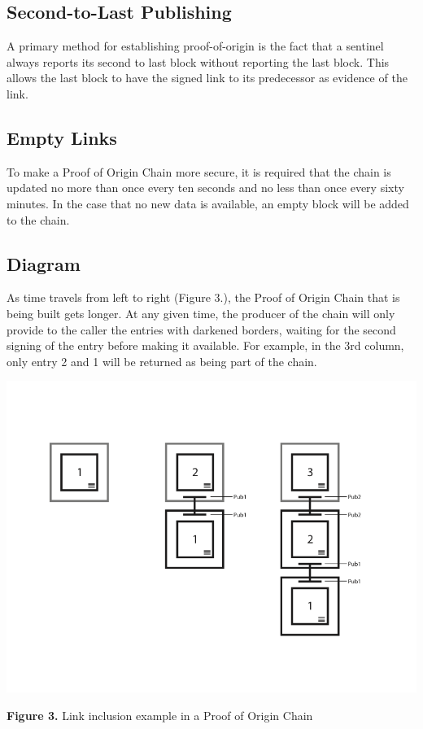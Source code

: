 \documentclass{article}
\begin{document}
\subsection {Second-to-Last Publishing}
A primary method for establishing \Gls{proof-of-origin} is the fact that a \Gls{sentinel} always reports its second to last block without reporting the last block. This allows the last block to have the signed link to its predecessor as evidence of the link.

\subsection {Empty Links}
To make a Proof of Origin Chain more secure, it is required that the chain is updated no more than once every ten seconds and no less than once every sixty minutes. In the case that no new data is available, an empty block will be added to the chain.

\subsection {Diagram}
As time travels from left to right (Figure 3.), the Proof of Origin Chain that is being built gets longer. At any given time, the producer of the chain will only provide to the caller the entries with darkened borders, waiting for the second signing of the entry before making it available. For example, in the 3rd column, only entry 2 and 1 will be returned as being part of the chain.

\includegraphics[width=\textwidth] {proofoforigin}
\begin{center}\textbf{Figure 3.}  Link inclusion example in a Proof of Origin Chain
\end{center}
\end{document}
